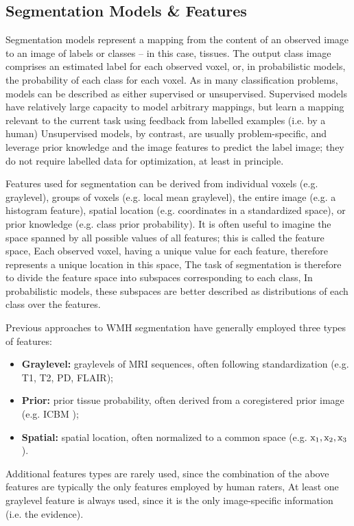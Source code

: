 \subsection{Segmentation Models \& Features}
Segmentation models represent a mapping from the content of an observed image to an image of labels or classes -- in this case, tissues.
The output class image comprises an estimated label for each observed voxel, or, in probabilistic models, the probability of each class for each voxel.
As in many classification problems, models can be described as either supervised or unsupervised.
Supervised models have relatively large capacity to model arbitrary mappings, but learn a mapping relevant to the current task using feedback from labelled examples (i.e. by a human)
Unsupervised models, by contrast, are usually problem-specific, and leverage prior knowledge and the image features to predict the label image; they do not require labelled data for optimization, at least in principle.
\par
Features used for segmentation can be derived from individual voxels (e.g. graylevel), groups of voxels (e.g. local mean graylevel), the entire image (e.g. a histogram feature), spatial location (e.g. coordinates in a standardized space), or prior knowledge (e.g. class prior probability).
It is often useful to imagine the space spanned by all possible values of all features; this is called the feature space,
Each observed voxel, having a unique value for each feature, therefore represents a unique location in this space,
The task of segmentation is therefore to divide the feature space into subspaces corresponding to each class,
In probabilistic models, these subspaces are better described as distributions of each class over the features.
\par
Previous approaches to WMH segmentation have generally employed three types of features:
\begin{itemize}
  \item \textbf{Graylevel:} graylevels of MRI sequences, often following standardization (e.g. T1, T2, PD, FLAIR);
  \item \textbf{Prior:} prior tissue probability, often derived from a coregistered prior image (e.g. ICBM \cite{Mazziotta2001});
  \item \textbf{Spatial:} spatial location, often normalized to a common space (e.g. $\mathrm{x}_1,\mathrm{x}_2,\mathrm{x}_3$).
\end{itemize}
Additional features types are rarely used, since the combination of the above features are typically the only features employed by human raters,
At least one graylevel feature is always used, since it is the only image-specific information (i.e. the evidence).
